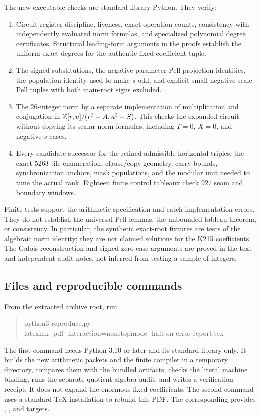 The new executable checks are standard-library Python. They verify:
\begin{enumerate}
\item Circuit register discipline, liveness, exact operation counts,
  consistency with independently evaluated norm formulas, and specialized
  polynomial degree certificates. Structural leading-form arguments in
  the proofs establish the uniform exact degrees for the authentic fixed
  coefficient tuple.
\item The signed substitutions, the negative-parameter Pell projection
  identities, the population identity used to make $s$ odd, and explicit
  small negative-scale Pell tuples with both main-root signs excluded.
\item The 26-integer norm by a separate implementation of multiplication
  and conjugation in $\mathbb Z[r,u]/(r^2-A,u^2-S)$. This checks the expanded
  circuit without copying its scalar norm formulas, including $T=0$,
  $X=0$, and negative-$s$ cases.
\item Every candidate successor for the refined admissible horizontal
  triples, the exact 5263-tile enumeration, clause/copy geometry, carry
  bounds, synchronization anchors, mask populations, and the modular unit
  needed to tune the actual rank. Eighteen finite control tableaux check
  927 seam and boundary windows.
\end{enumerate}

Finite tests support the arithmetic specification and catch implementation
errors. They do not establish the universal Pell lemmas, the unbounded
tableau theorem, or consistency. In particular, the synthetic exact-root
fixtures are tests of the algebraic norm identity; they are not claimed
solutions for the K215 coefficients. The Galois reconstruction and signed
zero-case arguments are proved in the text and independent audit notes,
not inferred from testing a sample of integers.

\subsection{Files and reproducible commands}

From the extracted archive root, run
\begin{quote}\ttfamily
python3 reproduce.py\\
latexmk -pdf -interaction=nonstopmode -halt-on-error report.tex
\end{quote}
The first command needs Python 3.10 or later and its standard library only.
It builds the new arithmetic packets and the finite compiler in a temporary
directory, compares them with the bundled artifacts, checks the literal
machine binding, runs the separate quotient-algebra audit, and writes a
verification receipt. It does not expand the enormous fixed coefficients.
The second command uses a standard TeX installation to rebuild this PDF.
The corresponding  provides , , and
 targets.

